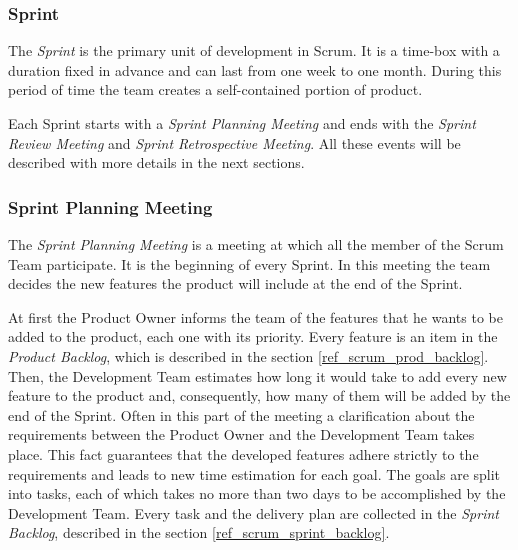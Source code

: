 			
			\subsubsection{Sprint}\label{ref_scrum_sprint}
			The \emph{Sprint} is the primary unit of development in Scrum. It is a time-box with a duration fixed in advance and can last from one week to one month. During this period of time the team creates a self-contained portion of product. 

			Each Sprint starts with a \emph{Sprint Planning Meeting} and ends with the \emph{Sprint Review Meeting} and \emph{Sprint Retrospective Meeting}. All these events will be described with more details in the next sections.  
		

			\subsubsection{Sprint Planning Meeting}\label{ref_scrum_sprint_plan}
			The \emph{Sprint Planning Meeting} is a meeting at which all the member of the Scrum Team participate. It is the beginning of every Sprint. In this meeting the team decides the new features the product will include at the end of the Sprint.

			At first the Product Owner informs the team of the features that he wants to be added to the product, each one with its priority. Every feature is an item in the \emph{Product Backlog}, which is described in the section \ref{ref_scrum_prod_backlog}. Then, the Development Team estimates how long it would take to add every new feature to the product and, consequently, how many of them will be added by the end of the Sprint. Often in this part of the meeting a clarification about the requirements between the Product Owner and the Development Team takes place. This fact guarantees that the developed features adhere strictly to the requirements and leads to new time estimation for each goal. The goals are split into tasks, each of which takes no more than two days to be accomplished by the Development Team. Every task and the delivery plan are collected in the \emph{Sprint Backlog}, described in the section \ref{ref_scrum_sprint_backlog}.

